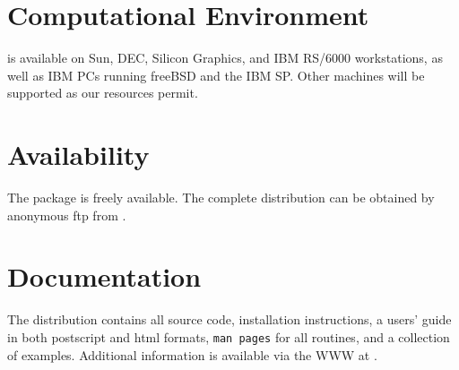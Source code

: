 \section*{Computational Environment}
 is available on Sun, DEC, Silicon Graphics, and IBM
RS/6000 workstations, as well as IBM PCs running freeBSD and the
IBM SP. Other machines will be supported as our resources permit.

\section*{Availability}

The  package is freely available.
The complete distribution can be obtained by anonymous ftp from 
.

\section*{Documentation}

The  distribution contains all source code, 
installation instructions,
a users' guide in both postscript and html formats, 
{\tt man pages} for all routines,
and a collection of examples.
Additional information is available via the WWW at
.

\makeinfo

